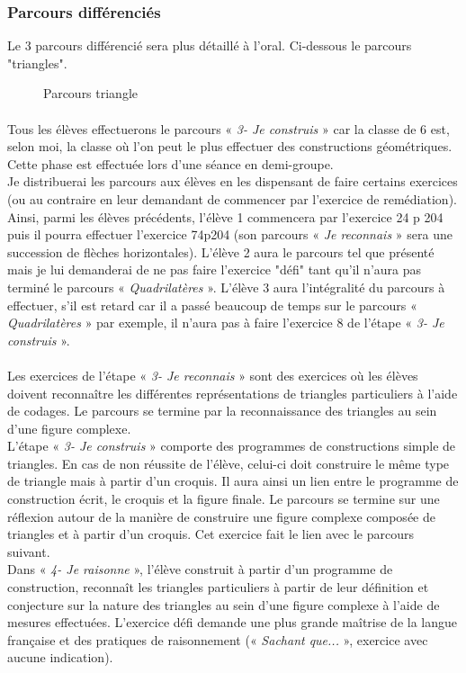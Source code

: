 \subsubsection*{Parcours différenciés}\label{parcours_diff3}
Le 3 parcours différencié sera plus détaillé à l'oral. Ci-dessous le parcours "triangles".
\begin{figure}[!h]
	\centering
	\caption{Parcours triangle}
\end{figure}
\paragraph{}Tous les élèves effectuerons le parcours « \textit{3- Je construis} » car la classe de 6 est, selon moi, la classe où l'on peut le plus effectuer des constructions géométriques. Cette phase est effectuée lors d'une séance en demi-groupe.\\
Je distribuerai les parcours aux élèves en les dispensant de faire certains exercices (ou au contraire en leur demandant de commencer par l'exercice de remédiation).\\
Ainsi, parmi les élèves précédents, l'élève 1 commencera par l'exercice 24 p 204 puis il pourra effectuer l'exercice 74p204 (son parcours « \textit{Je reconnais} » sera une succession de flèches horizontales). L'élève 2 aura le parcours tel que présenté mais je lui demanderai de ne pas faire l'exercice "défi" tant qu'il n'aura pas terminé le parcours « \textit{Quadrilatères} ». L'élève 3 aura l'intégralité du parcours à effectuer, s'il est retard car il a passé beaucoup de temps sur le parcours « \textit{Quadrilatères} » par exemple, il n'aura pas à faire l'exercice 8 de l'étape « \textit{3- Je construis} ».
\paragraph{} Les exercices de l'étape « \textit{3- Je reconnais} » sont des exercices où les élèves doivent reconnaître les différentes représentations de triangles particuliers à l'aide de codages. Le parcours se termine par la reconnaissance des triangles au sein d'une figure complexe.\\
L'étape « \textit{3- Je construis} » comporte des programmes de constructions simple de triangles. En cas de non réussite de l'élève, celui-ci doit construire le même type de triangle mais à partir d'un croquis. Il aura ainsi un lien entre le programme de construction écrit, le croquis et la figure finale. Le parcours se termine sur une réflexion autour de la manière de construire une figure complexe composée de triangles et à partir d'un croquis. Cet exercice fait le lien avec le parcours suivant.\\
Dans « \textit{4- Je raisonne} », l'élève construit à partir d'un programme de construction, reconnaît les triangles particuliers à partir de leur définition et conjecture sur la nature des triangles au sein d'une figure complexe à l'aide de mesures effectuées. L'exercice défi demande une plus grande maîtrise de la langue française et des pratiques de raisonnement (« \textit{Sachant que...} », exercice avec aucune indication).